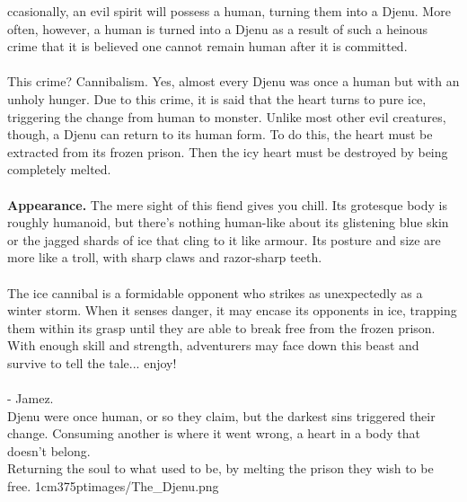 \documentclass[letterpaper,openany,oneside,twocolumn]{book}
\begin{document}

\MonsterSheetGeometry

\mainmatter%


\entryfont \noindent {}ccasionally, an evil spirit will possess a human, turning them into a Djenu. More often, however, a human is turned into a Djenu as a result of such a heinous crime that it is believed one cannot remain human after it is committed.\\\\
This crime? Cannibalism. Yes, almost every Djenu was once a human but with an unholy hunger. Due to this crime, it is said that the heart turns to pure ice, triggering the change from human to monster. Unlike most other evil creatures, though, a Djenu can return to its human form. To do this, the heart must be extracted from its frozen prison. Then the icy heart must be destroyed by being completely melted.\\\\
\textbf{Appearance.} The mere sight of this fiend gives you chill. Its grotesque body is roughly humanoid, but there's nothing human-like about its glistening blue skin or the jagged shards of ice that cling to it like armour. Its posture and size are more like a troll, with sharp claws and razor-sharp teeth.\\\\
The ice cannibal is a formidable opponent who strikes as unexpectedly as a winter storm. When it senses danger, it may encase its opponents in ice, trapping them within its grasp until they are able to break free from the frozen prison. With enough skill and strength, adventurers may face down this beast and survive to tell the tale... enjoy!\\\\
- Jamez.\\

%
{%
	Djenu were once human, or so they claim, but the darkest sins triggered their change. Consuming another is where it went wrong, a heart in a body that doesn't belong.\\ Returning the soul to what used to be, by melting the prison they wish to be free.%
}{1cm}{375pt}{images/The_Djenu.png}%
\end{document}
